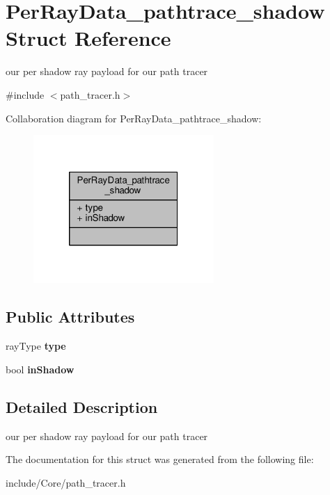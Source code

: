 \hypertarget{struct_per_ray_data__pathtrace__shadow}{\section{Per\-Ray\-Data\-\_\-pathtrace\-\_\-shadow Struct Reference}
\label{struct_per_ray_data__pathtrace__shadow}
}


our per shadow ray payload for our path tracer  




{\ttfamily \#include $<$path\-\_\-tracer.\-h$>$}



Collaboration diagram for Per\-Ray\-Data\-\_\-pathtrace\-\_\-shadow\-:
\nopagebreak
\begin{figure}[H]
\begin{center}
\leavevmode
\includegraphics[width=194pt]{struct_per_ray_data__pathtrace__shadow__coll__graph}
\end{center}
\end{figure}
\subsection*{Public Attributes}
\begin{DoxyCompactItemize}
\item 
\hypertarget{struct_per_ray_data__pathtrace__shadow_a5cba1879916568be567c828f9a378a85}{ray\-Type {\bfseries type}}\label{struct_per_ray_data__pathtrace__shadow_a5cba1879916568be567c828f9a378a85}

\item 
\hypertarget{struct_per_ray_data__pathtrace__shadow_ab918fc560728b96d87be882d56546a82}{bool {\bfseries in\-Shadow}}\label{struct_per_ray_data__pathtrace__shadow_ab918fc560728b96d87be882d56546a82}

\end{DoxyCompactItemize}


\subsection{Detailed Description}
our per shadow ray payload for our path tracer 

The documentation for this struct was generated from the following file\-:\begin{DoxyCompactItemize}
\item 
include/\-Core/path\-\_\-tracer.\-h\end{DoxyCompactItemize}
